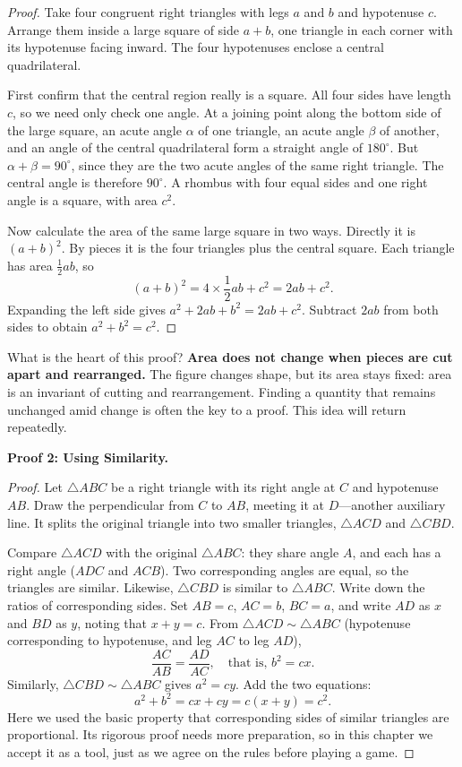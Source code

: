 \begin{proof}
Take four congruent right triangles with legs $a$ and $b$ and hypotenuse $c$. Arrange them inside a large square of side $a+b$, one triangle in each corner with its hypotenuse facing inward. The four hypotenuses enclose a central quadrilateral.

First confirm that the central region really is a square. All four sides have length $c$, so we need only check one angle. At a joining point along the bottom side of the large square, an acute angle $\alpha$ of one triangle, an acute angle $\beta$ of another, and an angle of the central quadrilateral form a straight angle of $180^\circ$. But $\alpha+\beta=90^\circ$, since they are the two acute angles of the same right triangle. The central angle is therefore $90^\circ$. A rhombus with four equal sides and one right angle is a square, with area $c^2$.

Now calculate the area of the same large square in two ways. Directly it is $(a+b)^2$. By pieces it is the four triangles plus the central square. Each triangle has area $\frac{1}{2}ab$, so
\[
(a+b)^2=4\times\frac{1}{2}ab+c^2=2ab+c^2.
\]
Expanding the left side gives $a^2+2ab+b^2=2ab+c^2$. Subtract $2ab$ from both sides to obtain $a^2+b^2=c^2$.
\end{proof}

What is the heart of this proof? \textbf{Area does not change when pieces are cut apart and rearranged.} The figure changes shape, but its area stays fixed: area is an invariant of cutting and rearrangement. Finding a quantity that remains unchanged amid change is often the key to a proof. This idea will return repeatedly.

\textbf{Proof 2: Using Similarity.}

\begin{proof}
Let $\triangle ABC$ be a right triangle with its right angle at $C$ and hypotenuse $AB$. Draw the perpendicular from $C$ to $AB$, meeting it at $D$---another auxiliary line. It splits the original triangle into two smaller triangles, $\triangle ACD$ and $\triangle CBD$.

Compare $\triangle ACD$ with the original $\triangle ABC$: they share angle $A$, and each has a right angle ($ADC$ and $ACB$). Two corresponding angles are equal, so the triangles are similar. Likewise, $\triangle CBD$ is similar to $\triangle ABC$. Write down the ratios of corresponding sides. Set $AB=c$, $AC=b$, $BC=a$, and write $AD$ as $x$ and $BD$ as $y$, noting that $x+y=c$. From $\triangle ACD \sim \triangle ABC$ (hypotenuse corresponding to hypotenuse, and leg $AC$ to leg $AD$),
\[
\frac{AC}{AB}=\frac{AD}{AC},\quad\text{that is, } b^2=cx.
\]
Similarly, $\triangle CBD \sim \triangle ABC$ gives $a^2=cy$. Add the two equations:
\[
a^2+b^2=cx+cy=c(x+y)=c^2.
\]
Here we used the basic property that corresponding sides of similar triangles are proportional. Its rigorous proof needs more preparation, so in this chapter we accept it as a tool, just as we agree on the rules before playing a game.
\end{proof}

